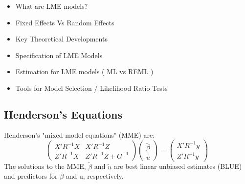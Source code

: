 \begin{itemize}
\item  What are LME models?
\item  Fixed Effects Vs Random Effects
\item  Key Theoretical Developments
\item  Specification of LME Models
\item  Estimation for LME models ( ML vs REML )
\item  Tools for Model Selection / Likelihood Ratio Tests
\end{itemize}

\subsection{Henderson's Equations}

Henderson's "mixed model equations" (MME) are:
\[
\begin{pmatrix}  X'R^{-1}X & X'R^{-1}Z \\ Z'R^{-1}X & Z'R^{-1}Z + G^{-1} 
\end{pmatrix}\begin{pmatrix}  \tilde{\beta} \\ \tilde{u}
\end{pmatrix}=\begin{pmatrix} X'R^{-1}y  \\ Z'R^{-1}y
\end{pmatrix}
\]
The solutions to the MME, $\textstyle\tilde{\beta}$ and $\textstyle\tilde{u}$ are 
best linear unbiased estimates (BLUE) and predictors for $\beta$ and u, respectively. 


